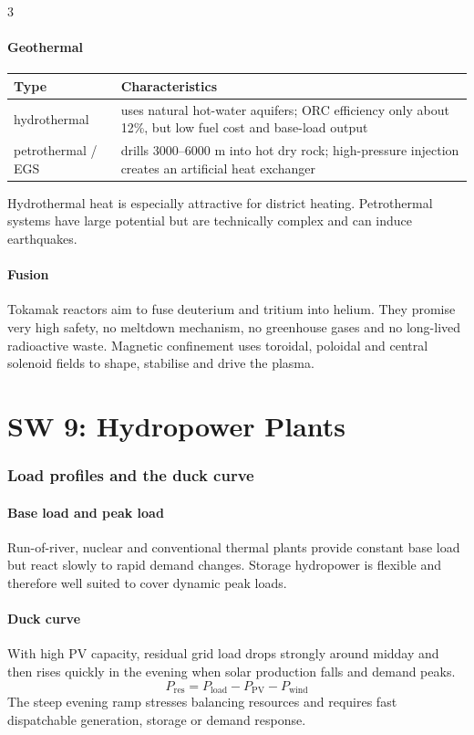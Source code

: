 \documentclass[9pt, landscape, a4paper]{article}
\begin{document}
\begin{multicols*}{3}
\subsection{Geothermal}
\begin{tabularx}{\columnwidth}{@{}lX@{}}
  \toprule
  \textbf{Type} & \textbf{Characteristics}\\
  \midrule
  hydrothermal & uses natural hot-water aquifers; ORC efficiency only about 12\%, but low fuel cost and base-load output\\
  petrothermal / EGS & drills 3000--6000 m into hot dry rock; high-pressure injection creates an artificial heat exchanger\\
  \bottomrule
\end{tabularx}
Hydrothermal heat is especially attractive for district heating. Petrothermal
systems have large potential but are technically complex and can induce
earthquakes.

\subsection{Fusion}
Tokamak reactors aim to fuse deuterium and tritium into helium. They promise
very high safety, no meltdown mechanism, no greenhouse gases and no long-lived
radioactive waste. Magnetic confinement uses toroidal, poloidal and central
solenoid fields to shape, stabilise and drive the plasma.

\part{SW 9: Hydropower Plants}
\section{Load profiles and the duck curve}
\subsection{Base load and peak load}
Run-of-river, nuclear and conventional thermal plants provide constant base
load but react slowly to rapid demand changes. Storage hydropower is flexible
and therefore well suited to cover dynamic peak loads.

\subsection{Duck curve}
With high PV capacity, residual grid load drops strongly around midday and then
rises quickly in the evening when solar production falls and demand peaks.
\[
  P_{\mathrm{res}}=P_{\mathrm{load}}-P_{\mathrm{PV}}-P_{\mathrm{wind}}
\]
The steep evening ramp stresses balancing resources and requires fast
dispatchable generation, storage or demand response.


\end{multicols*}
\end{document}
